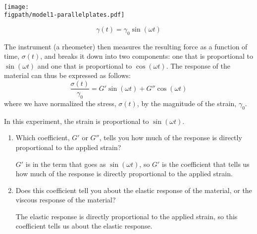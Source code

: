 \begin{activity}
\begin{model}
	\vspace{0.1in}
	\begin{minipage}{0.15\textwidth}
	~
	\end{minipage}
	\begin{minipage}{0.35\textwidth}
		\centerline{\texttt{[image: \\figpath/model1-parallelplates.pdf]}}
	\end{minipage}
	\begin{minipage}{0.4\textwidth}
		\begin{equation*}
			\gamma(t) = \gamma_0 \sin(\omega t)
		\end{equation*}
	\end{minipage}
	\vspace{0.1in}
	
	The instrument (a rheometer) then measures the resulting force as a function of time, $\sigma(t)$, and breaks it down into two components: one that is proportional to $\sin(\omega t)$ and one that is proportional to $\cos(\omega t)$. The response of the material can thus be expressed as follows:
	\begin{equation*}
		\frac{\sigma(t)}{\gamma_0} = G' \sin(\omega t) + G'' \cos(\omega t)
	\end{equation*}
	where we have normalized the stress, $\sigma(t)$, by the magnitude of the strain, $\gamma_0$.

\end{model}

\begin{ctqs}
		
		\question In this experiment, the strain is proportional to $\sin(\omega t)$.  
			\begin{enumerate}
				\item Which coefficient, $G'$ or $G''$, tells you how much of the response is directly proportional to the applied strain?
	
					\begin{solution}[1.1in]
						$G'$ is in the term that goes as $\sin(\omega t)$, so $G'$ is the coefficient that tells us how much of the response is directly proportional to the applied strain.
					\end{solution}
		
		\item Does this coefficient tell you about the elastic response of the material, or the viscous response of the material?
	
					\begin{solution}[1.1in]
						The elastic response is directly proportional to the applied strain, so this coefficient tells us about the elastic response.
					\end{solution}
					

\end{enumerate}
\end{ctqs}
\end{activity}
